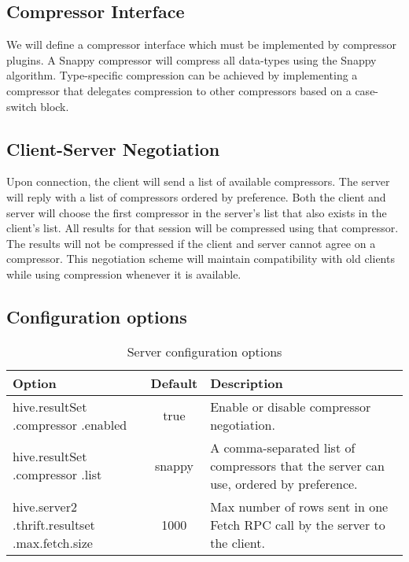 \documentclass[11pt,a4paper]{article}
\begin{document}
	\subsection{Compressor Interface}
		We will define a compressor interface which must be implemented by compressor plugins.
		A Snappy compressor will compress all data-types using the Snappy algorithm.
		Type-specific compression can be achieved by implementing a compressor that delegates compression to other compressors based on a case-switch block.
		
	\subsection{Client-Server Negotiation}
		Upon connection, the client will send a list of available compressors. The server will reply with a list of compressors ordered by preference.
		Both the client and server will choose the first compressor in the server's list that also exists in the client's list.
		All results for that session will be compressed using that compressor.
		The results will not be compressed if the client and server cannot agree on a compressor.
		This negotiation scheme will maintain compatibility with old clients while using compression whenever it is available.
		
	\subsection{Configuration options}
		\begin{table}[H]
			\begin{tabular}{| p{3cm} | c | p{6.5cm} |} \hline
				\textbf{Option} & \textbf{Default} & \textbf{Description} \\ \hline
				hive.resultSet\linebreak
				.compressor\linebreak
				.enabled
				& true & Enable or disable compressor negotiation. \\ \hline
				hive.resultSet\linebreak
				.compressor\linebreak
				.list
				& snappy & A comma-separated list of compressors that the server can use, ordered by preference.
				\\ \hline
				hive.server2\linebreak
				.thrift.resultset\linebreak
				.max.fetch.size
				& 1000 & Max number of rows sent in one Fetch RPC call by the server to the client.
				\\ \hline
			\end{tabular}
			\caption{Server configuration options}
		\end{table}
\end{document}
